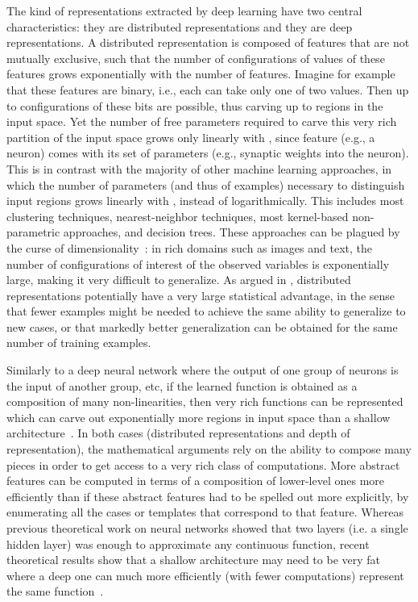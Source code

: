 \documentclass[11pt]{article} %
\begin{document}
The kind of representations extracted by deep learning have two central
characteristics: they are distributed representations and they are deep
representations. A distributed representation is composed of features that
are not mutually exclusive, such that the number of configurations of
values of these features grows exponentially with the number of
features. Imagine for example that these features are binary, i.e., each
can take only one of two values. Then up to configurations of these bits
are possible, thus carving up to regions in the input space. Yet the number
of free parameters required to carve this very rich partition of the input
space grows only linearly with , since feature (e.g., a neuron) comes with
its set of parameters (e.g., synaptic weights into the neuron). This is in
contrast with the majority of other machine learning approaches, in which
the number of parameters (and thus of examples) necessary to distinguish
input regions grows linearly with , instead of logarithmically. This
includes most clustering techniques, nearest-neighbor techniques, most
kernel-based non-parametric approaches, and decision trees. These
approaches can be plagued by the curse of
dimensionality~\citep{Bengio-localfailure-NIPS-2006-small,Bengio-decision-trees10}:
in rich domains such as images and text, the number of configurations of
interest of the observed variables is exponentially large, making it very
difficult to generalize. As argued in \citet{Bengio-book-2009,Montufar+Morton-2014,Montufar-et-al-NIPS2014},
distributed representations potentially have a very large
statistical advantage, in the sense that fewer examples might be needed to
achieve the same ability to generalize to new cases, or that markedly
better generalization can be obtained for the same number of training
examples.


Similarly to a deep neural network where the output of one group of neurons
is the input of another group, etc, if the learned function is obtained as
a composition of many non-linearities, then very rich functions can be
represented which can carve out exponentially more regions in input space
than a shallow architecture~\citep{Montufar-et-al-NIPS2014}. In both cases (distributed
representations and depth of representation), the mathematical arguments
rely on the ability to compose many pieces in order to get access to a very
rich class of computations. More abstract features can be computed in terms
of a composition of lower-level ones more efficiently than if these
abstract features had to be spelled out more explicitly, by enumerating all
the cases or templates that correspond to that feature. Whereas previous
theoretical work on neural networks showed that two layers (i.e. a single
hidden layer) was enough to approximate any continuous function, recent
theoretical results show that a shallow architecture may need to be very
fat where a deep one can much more efficiently (with fewer computations)
represent the same function~\citep{Bengio+Delalleau-ALT-2011-small,Montufar-et-al-NIPS2014}.
\end{document}
